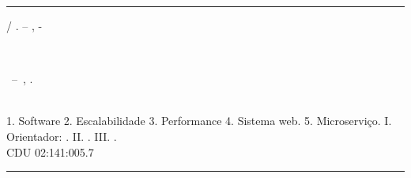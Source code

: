 \documentclass[
	12pt,				%
	openright,			%
	twoside,			%
	a4paper,			%
	english,			%
	brazil				%
	]{abntex2}
\begin{document}
%
%     
\begin{fichacatalografica}
	\vspace*{\fill}					%
	\hrule							%
	\begin{center}					%
	\begin{minipage}[c]{12.5cm}		%

	\imprimirautor

	\hspace{0.5cm} \imprimirtitulo  / \imprimirautor. --
	\imprimirlocal, \imprimirdata-

	\hspace{0.5cm} \imprimirorientadorRotulo~\imprimirorientador\\

	\hspace{0.5cm}
	\parbox[t]{\textwidth}{\imprimirtipotrabalho~--~\imprimirinstituicao,
	\imprimirdata.}\\

	\hspace{0.5cm}
		1. Software
		2. Escalabilidade
		3. Performance
		4. Sistema web.
		5. Microserviço.
		I. Orientador: \imprimirorientador.
		II. \imprimirinstituicao.
		III. \imprimirtitulo.\\

	\hspace{8.75cm} CDU 02:141:005.7\\

	\end{minipage}
	\end{center}
	\hrule
\end{fichacatalografica}

\vspace{\onelineskip}



\end{document}
